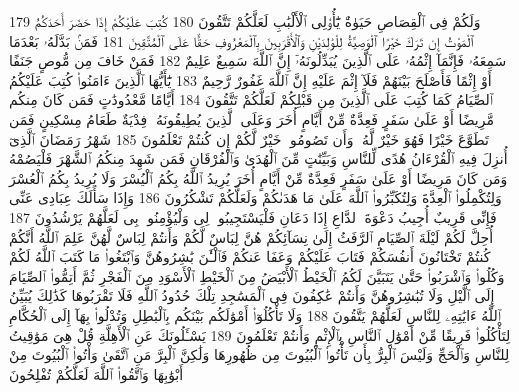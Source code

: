 {\tiny\colorbox{cl_aya}{179}} وَلَكُمْ فِى ٱلْقِصَاصِ حَيَوٰةٌ يَٰٓأُو۟لِى ٱلْأَلْبَٰبِ لَعَلَّكُمْ تَتَّقُونَ
{\tiny\colorbox{cl_aya}{180}} كُتِبَ عَلَيْكُمْ إِذَا حَضَرَ أَحَدَكُمُ ٱلْمَوْتُ إِن تَرَكَ خَيْرًا ٱلْوَصِيَّةُ لِلْوَٰلِدَيْنِ وَٱلْأَقْرَبِينَ بِٱلْمَعْرُوفِ حَقًّا عَلَى ٱلْمُتَّقِينَ
{\tiny\colorbox{cl_aya}{181}} فَمَنۢ بَدَّلَهُۥ بَعْدَمَا سَمِعَهُۥ فَإِنَّمَآ إِثْمُهُۥ عَلَى ٱلَّذِينَ يُبَدِّلُونَهُۥٓ إِنَّ ٱللَّهَ سَمِيعٌ عَلِيمٌ
{\tiny\colorbox{cl_aya}{182}} فَمَنْ خَافَ مِن مُّوصٍ جَنَفًا أَوْ إِثْمًا فَأَصْلَحَ بَيْنَهُمْ فَلَآ إِثْمَ عَلَيْهِ إِنَّ ٱللَّهَ غَفُورٌ رَّحِيمٌ
{\tiny\colorbox{cl_aya}{183}} يَٰٓأَيُّهَا ٱلَّذِينَ ءَامَنُوا۟ كُتِبَ عَلَيْكُمُ ٱلصِّيَامُ كَمَا كُتِبَ عَلَى ٱلَّذِينَ مِن قَبْلِكُمْ لَعَلَّكُمْ تَتَّقُونَ
{\tiny\colorbox{cl_aya}{184}} أَيَّامًا مَّعْدُودَٰتٍ فَمَن كَانَ مِنكُم مَّرِيضًا أَوْ عَلَىٰ سَفَرٍ فَعِدَّةٌ مِّنْ أَيَّامٍ أُخَرَ وَعَلَى ٱلَّذِينَ يُطِيقُونَهُۥ فِدْيَةٌ طَعَامُ مِسْكِينٍ فَمَن تَطَوَّعَ خَيْرًا فَهُوَ خَيْرٌ لَّهُۥ وَأَن تَصُومُوا۟ خَيْرٌ لَّكُمْ إِن كُنتُمْ تَعْلَمُونَ
{\tiny\colorbox{cl_aya}{185}} شَهْرُ رَمَضَانَ ٱلَّذِىٓ أُنزِلَ فِيهِ ٱلْقُرْءَانُ هُدًى لِّلنَّاسِ وَبَيِّنَٰتٍ مِّنَ ٱلْهُدَىٰ وَٱلْفُرْقَانِ فَمَن شَهِدَ مِنكُمُ ٱلشَّهْرَ فَلْيَصُمْهُ وَمَن كَانَ مَرِيضًا أَوْ عَلَىٰ سَفَرٍ فَعِدَّةٌ مِّنْ أَيَّامٍ أُخَرَ يُرِيدُ ٱللَّهُ بِكُمُ ٱلْيُسْرَ وَلَا يُرِيدُ بِكُمُ ٱلْعُسْرَ وَلِتُكْمِلُوا۟ ٱلْعِدَّةَ وَلِتُكَبِّرُوا۟ ٱللَّهَ عَلَىٰ مَا هَدَىٰكُمْ وَلَعَلَّكُمْ تَشْكُرُونَ
{\tiny\colorbox{cl_aya}{186}} وَإِذَا سَأَلَكَ عِبَادِى عَنِّى فَإِنِّى قَرِيبٌ أُجِيبُ دَعْوَةَ ٱلدَّاعِ إِذَا دَعَانِ فَلْيَسْتَجِيبُوا۟ لِى وَلْيُؤْمِنُوا۟ بِى لَعَلَّهُمْ يَرْشُدُونَ
{\tiny\colorbox{cl_aya}{187}} أُحِلَّ لَكُمْ لَيْلَةَ ٱلصِّيَامِ ٱلرَّفَثُ إِلَىٰ نِسَآئِكُمْ هُنَّ لِبَاسٌ لَّكُمْ وَأَنتُمْ لِبَاسٌ لَّهُنَّ عَلِمَ ٱللَّهُ أَنَّكُمْ كُنتُمْ تَخْتَانُونَ أَنفُسَكُمْ فَتَابَ عَلَيْكُمْ وَعَفَا عَنكُمْ فَٱلْـَٰٔنَ بَٰشِرُوهُنَّ وَٱبْتَغُوا۟ مَا كَتَبَ ٱللَّهُ لَكُمْ وَكُلُوا۟ وَٱشْرَبُوا۟ حَتَّىٰ يَتَبَيَّنَ لَكُمُ ٱلْخَيْطُ ٱلْأَبْيَضُ مِنَ ٱلْخَيْطِ ٱلْأَسْوَدِ مِنَ ٱلْفَجْرِ ثُمَّ أَتِمُّوا۟ ٱلصِّيَامَ إِلَى ٱلَّيْلِ وَلَا تُبَٰشِرُوهُنَّ وَأَنتُمْ عَٰكِفُونَ فِى ٱلْمَسَٰجِدِ تِلْكَ حُدُودُ ٱللَّهِ فَلَا تَقْرَبُوهَا كَذَٰلِكَ يُبَيِّنُ ٱللَّهُ ءَايَٰتِهِۦ لِلنَّاسِ لَعَلَّهُمْ يَتَّقُونَ
{\tiny\colorbox{cl_aya}{188}} وَلَا تَأْكُلُوٓا۟ أَمْوَٰلَكُم بَيْنَكُم بِٱلْبَٰطِلِ وَتُدْلُوا۟ بِهَآ إِلَى ٱلْحُكَّامِ لِتَأْكُلُوا۟ فَرِيقًا مِّنْ أَمْوَٰلِ ٱلنَّاسِ بِٱلْإِثْمِ وَأَنتُمْ تَعْلَمُونَ
{\tiny\colorbox{cl_aya}{189}} يَسْـَٔلُونَكَ عَنِ ٱلْأَهِلَّةِ قُلْ هِىَ مَوَٰقِيتُ لِلنَّاسِ وَٱلْحَجِّ وَلَيْسَ ٱلْبِرُّ بِأَن تَأْتُوا۟ ٱلْبُيُوتَ مِن ظُهُورِهَا وَلَٰكِنَّ ٱلْبِرَّ مَنِ ٱتَّقَىٰ وَأْتُوا۟ ٱلْبُيُوتَ مِنْ أَبْوَٰبِهَا وَٱتَّقُوا۟ ٱللَّهَ لَعَلَّكُمْ تُفْلِحُونَ

